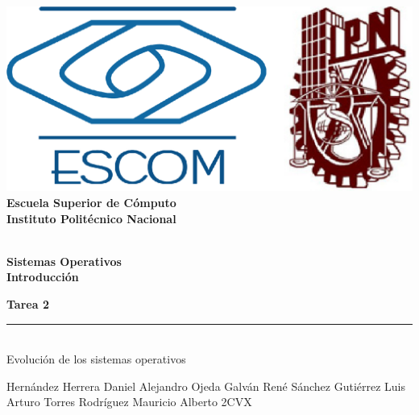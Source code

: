 
\begin{titlepage} %

    \begin{flushright}

	   \includegraphics[scale=0.15]{imagenes/escom-ipn.png}
	   \large \textbf{\\Escuela Superior de C\'omputo}
	   \large \textbf{\\Instituto Polit\'ecnico Nacional }%

	   \vspace{2.5cm} %

	   \large \textbf{\\Sistemas Operativos}%
	   \large \textbf{\\Introducción}%

	   \vspace{1.2cm} %

	   \large \textbf{Tarea 2}\\%
	   \rule{5cm}{3pt} %
	   \large{\\ Evolución de los sistemas operativos} %

	   \vspace{2.5cm} %

	   Hernández Herrera Daniel Alejandro
	   	   Ojeda Galván René
	   	   Sánchez Gutiérrez Luis Arturo
	   	   Torres Rodríguez Mauricio Alberto
	   2CVX %

	   \vspace{2.5cm} %

	   \date{\today}

    \end{flushright}

\end{titlepage}
